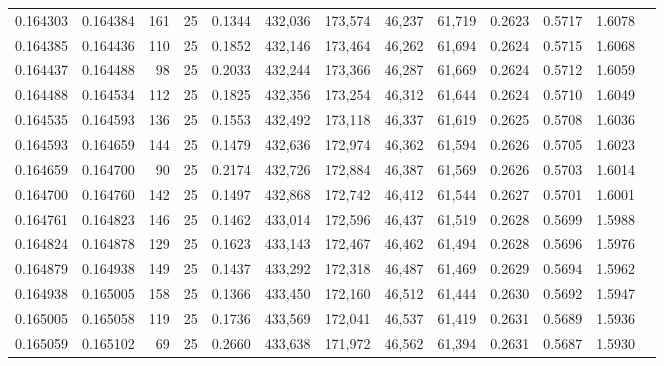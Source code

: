 \begin{tabular}{rrrrrrrrrrrrr}
0.164303 & 0.164384 &   161 &  25 &                                     0.1344 & 432,036 & 173,574 &  46,237 &  61,719 & 0.2623 & 0.5717 & 1.6078 \\
0.164385 & 0.164436 &   110 &  25 &                                     0.1852 & 432,146 & 173,464 &  46,262 &  61,694 & 0.2624 & 0.5715 & 1.6068 \\
0.164437 & 0.164488 &    98 &  25 &                                     0.2033 & 432,244 & 173,366 &  46,287 &  61,669 & 0.2624 & 0.5712 & 1.6059 \\
0.164488 & 0.164534 &   112 &  25 &                                     0.1825 & 432,356 & 173,254 &  46,312 &  61,644 & 0.2624 & 0.5710 & 1.6049 \\
0.164535 & 0.164593 &   136 &  25 &                                     0.1553 & 432,492 & 173,118 &  46,337 &  61,619 & 0.2625 & 0.5708 & 1.6036 \\
0.164593 & 0.164659 &   144 &  25 &                                     0.1479 & 432,636 & 172,974 &  46,362 &  61,594 & 0.2626 & 0.5705 & 1.6023 \\
0.164659 & 0.164700 &    90 &  25 &                                     0.2174 & 432,726 & 172,884 &  46,387 &  61,569 & 0.2626 & 0.5703 & 1.6014 \\
0.164700 & 0.164760 &   142 &  25 &                                     0.1497 & 432,868 & 172,742 &  46,412 &  61,544 & 0.2627 & 0.5701 & 1.6001 \\
0.164761 & 0.164823 &   146 &  25 &                                     0.1462 & 433,014 & 172,596 &  46,437 &  61,519 & 0.2628 & 0.5699 & 1.5988 \\
0.164824 & 0.164878 &   129 &  25 &                                     0.1623 & 433,143 & 172,467 &  46,462 &  61,494 & 0.2628 & 0.5696 & 1.5976 \\
0.164879 & 0.164938 &   149 &  25 &                                     0.1437 & 433,292 & 172,318 &  46,487 &  61,469 & 0.2629 & 0.5694 & 1.5962 \\
0.164938 & 0.165005 &   158 &  25 &                                     0.1366 & 433,450 & 172,160 &  46,512 &  61,444 & 0.2630 & 0.5692 & 1.5947 \\
0.165005 & 0.165058 &   119 &  25 &                                     0.1736 & 433,569 & 172,041 &  46,537 &  61,419 & 0.2631 & 0.5689 & 1.5936 \\
0.165059 & 0.165102 &    69 &  25 &                                     0.2660 & 433,638 & 171,972 &  46,562 &  61,394 & 0.2631 & 0.5687 & 1.5930 \\

\end{tabular}
